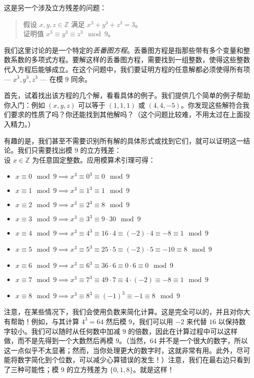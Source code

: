 \begin{example}
    这是另一个涉及立方残差的问题：
    \begin{quote}
        假设 $x, y, z \in \mathbb{Z}$ 满足 $x^3+y^3+z^3=3$。\\
        证明值 $x^3 \equiv y^3 \equiv z^3 \mod 9$。
    \end{quote}

    我们这里讨论的是一个特定的\emph{丢番图方程}。丢番图方程是指那些带有多个变量和整数系数的多项式方程。要解这样的丢番图方程，需要找到一组整数，使得这些整数代入方程后能够成立。在这个问题中，我们要证明方程的任意解都必须使得所有项 --- $x^3, y^3, z^3$ --- 在模 $9$ 同余。

    首先，试着找出该方程的几个解，看看具体的例子。我们提供几个简单的例子帮助你入门：例如 $(x, y, z)$ 可以等于 $(1, 1, 1)$ 或 $(4, 4, -5)$。你发现这些解符合我们要求的性质了吗？你还能找到其他解吗？（这个问题比较难，不用太过在上面投入精力。）

    有趣的是，我们甚至不需要识别所有解的具体形式或找到它们，就可以证明这一结论。我们只需要找出模 $9$ 的立方残差：\\
    设 $x \in \mathbb{Z}$ 为任意固定整数。应用模算术引理可得：
    \begin{itemize}
        \item $x \equiv 0 \mod 9 \implies x^3 \equiv 0^3 \equiv 0 \mod 9$
        \item $x \equiv 1 \mod 9 \implies x^3 \equiv 1^3 \equiv 1 \mod 9$
        \item $x \equiv 2 \mod 9 \implies x^3 \equiv 2^3 \equiv 8 \mod 9$
        \item $x \equiv 3 \mod 9 \implies x^3 \equiv 3^3 \equiv 9 \cdot 3 0 \mod 9$
        \item $x \equiv 4 \mod 9 \implies x^3 \equiv 4^3 \equiv 16 \cdot 4 \equiv (-2) \cdot 4 \equiv -8 \equiv 1 \mod 9$
        \item $x \equiv 5 \mod 9 \implies x^3 \equiv 5^3 \equiv 25 \cdot 5 \equiv (-2) \cdot 5 \equiv -10 \equiv 8 \mod 9$
        \item $x \equiv 6 \mod 9 \implies x^3 \equiv 6^3 \equiv 36 \cdot 6 \equiv 0 \cdot 6 \equiv 0 \mod 9$
        \item $x \equiv 7 \mod 9 \implies x^3 \equiv 7^3 \equiv 49 \cdot 7 \equiv 4 \cdot (-2) \equiv -8 \equiv 1 \mod 9$
        \item $x \equiv 8 \mod 9 \implies x^3 \equiv 8^3 \equiv (-1)^3 \equiv -1 \equiv 8 \mod 9$
    \end{itemize}
    注意，在某些情况下，我们会使用负数来简化计算。这是完全可以的，并且对你大有帮助！例如，与其计算 $4^3 = 64$ 然后模 $9$，我们可以用 $-2$ 来代替 $16$ 以保持数字较小。我们可以随时从任何数中加减 $9$ 的倍数，因此在计算过程中可以这样做，而不是先得到一个大数然后再模 $9$。（当然，$64$ 并不是一个很大的数字，所以这一点似乎不太显著；然而，当你处理更大的数字时，这就非常有用。此外，尽可能将数字简化到个位数，可以减少心算错误的发生！）注意，我们在最右边只看到了三种可能性；模 $9$ 的立方残差为 $\{0, 1, 8\}$。就是这样！


\end{example}

